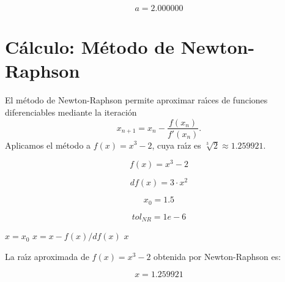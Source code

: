 \documentclass{article}
\begin{document}
\begin{equation}
    a = 
    2.000000
    \label{eq:res:a}
\end{equation}



\section{C\'alculo: M\'etodo de Newton-Raphson}

El m\'etodo de Newton-Raphson permite aproximar ra\'{\i}ces de funciones diferenciables
mediante la iteraci\'on 
\begin{equation}
    x_{n+1} = x_n - \frac{f(x_n)}{f'(x_n)}.
\end{equation}
Aplicamos el m\'etodo a $f(x) = x^3 - 2$, cuya ra\'{\i}z es $\sqrt[3]{2} \approx 1.259921$.

\begin{equation}
    f(x) = x^3 - 2
    \label{eq:calc:f}
\end{equation}

\begin{equation}
    df(x) = 3 \cdot x^2
    \label{eq:calc:df}
\end{equation}

\begin{equation}
    x_0 = 1.5
    \label{eq:calc:x0}
\end{equation}

\begin{equation}
    tol_{NR} = 1e-6
    \label{eq:calc:tolNR}
\end{equation}

\begin{algorithm}
\caption{M\'etodo de Newton-Raphson para $f(x) = x^3 - 2$}
\label{alg:calc:x}
\begin{algorithmic}
    \STATE $x = x_0$
        \STATE $x = x - f(x) / df(x)$
    \ENDWHILE
    \RETURN $x$
\end{algorithmic}
\end{algorithm}

La ra\'{\i}z aproximada de $f(x) = x^3 - 2$ obtenida por Newton-Raphson es:

\begin{equation}
    x =
    1.259921
    \label{eq:res:x}
\end{equation}
\end{document}
